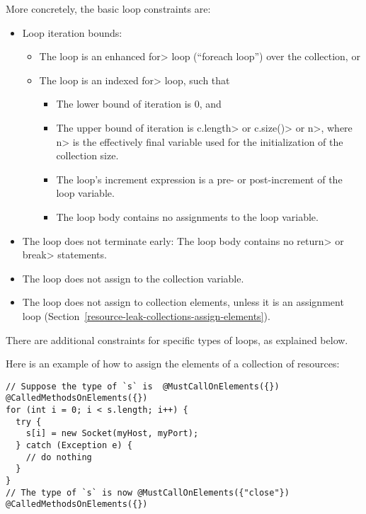 More concretely, the basic loop constraints are:
\begin{itemize}
\item Loop iteration bounds:
  \begin{itemize}
  \item
    The loop is an enhanced \<for> loop (``foreach loop'') over the collection, or
  \item
    The loop is an indexed \<for> loop, such that
    \begin{itemize}
    \item The lower bound of iteration is 0, and
    \item The upper bound of iteration is \<c.length> or \<c.size()> or \<n>,
      where \<n> is the effectively final variable used for the initialization of
      the collection size.
    \item The loop's increment expression is a pre- or post-increment of the
      loop variable.
    \item The loop body contains no assignments to the loop variable.
    \end{itemize}
  \end{itemize}
\item The loop does not terminate early: The loop body contains no \<return> or \<break> statements.
\item The loop does not assign to the collection variable.
\item The loop does not assign to collection elements, unless it is an
  assignment loop (Section~\ref{resource-leak-collections-assign-elements}).
\end{itemize}

\noindent There are additional constraints for specific types of loops, as
explained below.




Here is an example of how to assign the elements of a collection of resources:

\begin{Verbatim}
// Suppose the type of `s` is  @MustCallOnElements({}) @CalledMethodsOnElements({})
for (int i = 0; i < s.length; i++) {
  try {
    s[i] = new Socket(myHost, myPort);
  } catch (Exception e) {
    // do nothing
  }
}
// The type of `s` is now @MustCallOnElements({"close"}) @CalledMethodsOnElements({})
\end{Verbatim}

